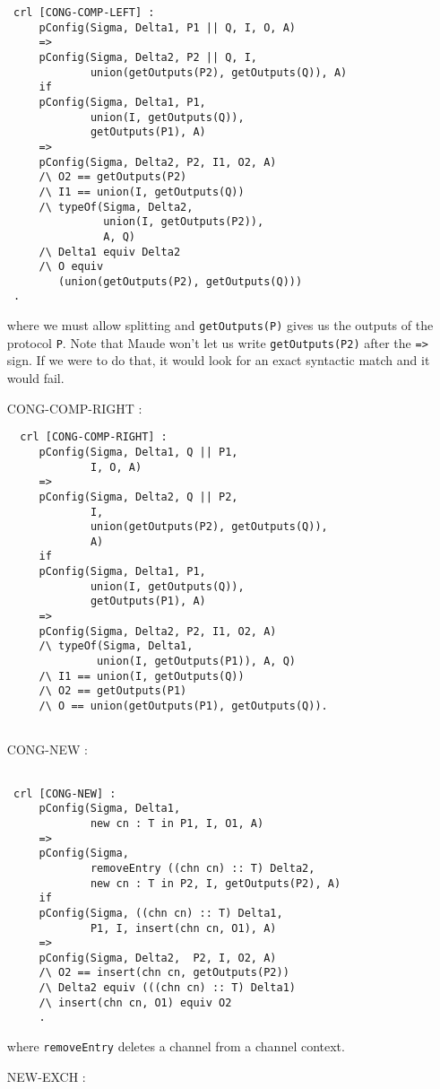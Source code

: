 \documentclass{article}
\begin{document}
\begin{itemize}
\begin{lstlisting}
 crl [CONG-COMP-LEFT] :
     pConfig(Sigma, Delta1, P1 || Q, I, O, A) 
     => 
     pConfig(Sigma, Delta2, P2 || Q, I,  
             union(getOutputs(P2), getOutputs(Q)), A)
     if
     pConfig(Sigma, Delta1, P1, 
             union(I, getOutputs(Q)), 
             getOutputs(P1), A)
     => 
     pConfig(Sigma, Delta2, P2, I1, O2, A)
     /\ O2 == getOutputs(P2) 
     /\ I1 == union(I, getOutputs(Q))
     /\ typeOf(Sigma, Delta2, 
               union(I, getOutputs(P2)), 
               A, Q)
     /\ Delta1 equiv Delta2
     /\ O equiv 
        (union(getOutputs(P2), getOutputs(Q)))
 .
 \end{lstlisting} 
 \noindent where we must allow splitting and 
 \texttt{getOutputs(P)} gives us the outputs of the protocol \texttt{P}. 
 Note that Maude won't let us write \texttt{getOutputs(P2)} after the 
 \texttt{=>} sign. If we were to do that, it would look for an exact 
 syntactic match and it would fail.
\item[CONG-COMP-RIGHT]:
\begin{lstlisting}
  crl [CONG-COMP-RIGHT] :
     pConfig(Sigma, Delta1, Q || P1, 
             I, O, A) 
     => 
     pConfig(Sigma, Delta2, Q || P2, 
             I, 
             union(getOutputs(P2), getOutputs(Q)), 
             A)
     if
     pConfig(Sigma, Delta1, P1, 
             union(I, getOutputs(Q)), 
             getOutputs(P1), A)
     => 
     pConfig(Sigma, Delta2, P2, I1, O2, A)
     /\ typeOf(Sigma, Delta1, 
              union(I, getOutputs(P1)), A, Q) 
     /\ I1 == union(I, getOutputs(Q))    
     /\ O2 == getOutputs(P1)      
     /\ O == union(getOutputs(P1), getOutputs(Q)).
   
    \end{lstlisting} 
\item[CONG-NEW]:
\begin{lstlisting}
   
 crl [CONG-NEW] : 
     pConfig(Sigma, Delta1, 
             new cn : T in P1, I, O1, A)
     => 
     pConfig(Sigma, 
             removeEntry ((chn cn) :: T) Delta2, 
             new cn : T in P2, I, getOutputs(P2), A)
     if
     pConfig(Sigma, ((chn cn) :: T) Delta1,  
             P1, I, insert(chn cn, O1), A)
     => 
     pConfig(Sigma, Delta2,  P2, I, O2, A) 
     /\ O2 == insert(chn cn, getOutputs(P2))
     /\ Delta2 equiv (((chn cn) :: T) Delta1)
     /\ insert(chn cn, O1) equiv O2
     .
    \end{lstlisting} 
   \noindent where \texttt{removeEntry} deletes a channel from a 
   channel context. 
\item[NEW-EXCH]:
\begin{lstlisting}   
    

\end{lstlisting}
\end{itemize}
\end{document}
